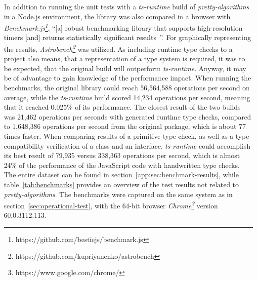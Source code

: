 In addition to running the unit tests with a \emph{ts-runtime} build of \emph{pretty-algorithms} in a Node.js environment, the library was also compared in a browser with \emph{Benchmark.js\footnote{https://github.com/bestiejs/benchmark.js}}, ``[a] robust benchmarking library that supports high-resolution timers [and] returns statistically significant results~\cite{Evaluation:benchmarkjs}''. For graphically representing the results, \emph{Astrobench\footnote{https://github.com/kupriyanenko/astrobench}} was utilized. As including runtime type checks to a project also means, that a representation of a type system is required, it was to be expected, that the original build will outperform \emph{ts-runtime}. Anyway, it may be of advantage to gain knowledge of the performance impact. When running the benchmarks, the original library could reach 56,564,588 operations per second on average, while the \emph{ts-runtime} build scored 14,234 operations per second, meaning that it reached 0.025\% of its performance. The closest result of the two builds was 21,462 operations per seconds with generated runtime type checks, compared to 1,648,386 operations per second from the original package, which is about 77 times faster. When comparing results of a primitive type check, as well as a type compatibility verification of a class and an interface, \emph{ts-runtime} could accomplish its best result of 79,935 versus 338,363 operations per second, which is almost 24\% of the performance of the JavaScript code with handwritten type checks. The entire dataset can be found in section~\ref{app:sec:benchmark-results}, while table~\ref{tab:benchmarks} provides an overview of the test results not related to \emph{pretty-algorithms}. The benchmarks were captured on the same system as in section~\ref{sec:operational-test}, with the 64-bit browser \emph{Chrome\footnote{https://www.google.com/chrome/}} version 60.0.3112.113.
